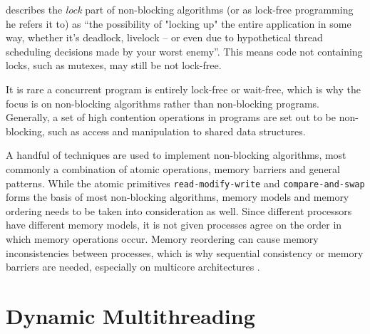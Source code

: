 \citet{preshing2012lockfree} describes the \textit{lock} part of non\hyp{}blocking algorithms (or as lock\hyp{}free programming he refers it to) as ``the possibility of "locking up" the entire application in some way, wheth\-er it's deadlock, livelock -- or even due to hypothetical thread scheduling decisions made by your worst enemy''. This means code not containing locks, such as mutexes, may still be not lock\hyp{}free. 

It is rare a concurrent program is entirely lock\hyp{}free or wait\hyp{}free, which is why the focus is on non\hyp{}blocking algorithms rather than non\hyp{}blocking programs. Generally, a set of high contention operations in programs are set out to be non\hyp{}blocking, such as access and manipulation to shared data structures.

A handful of techniques are used to implement non\hyp{}blocking algorithms, most commonly a combination of atomic operations, memory barriers and general patterns. While the atomic primitives \texttt{read\hyp{}modify\hyp{}write} and \texttt{compare\hyp{}and\hyp{}swap} forms the basis of most non\hyp{}blocking algorithms, memory models and memory ordering needs to be taken into consideration as well. Since different processors have different memory models, it is not given processes agree on the order in which memory operations occur. Memory reordering can cause memory inconsistencies between processes, which is why sequential consistency or memory barriers are needed, especially on multicore architectures \citep{preshing2012weakstrong,preshing2012barriers,preshing2012lockfree,preshing2012acquire}.


\section{Dynamic Multithreading}
\label{sec:dynamic_multithreading}



